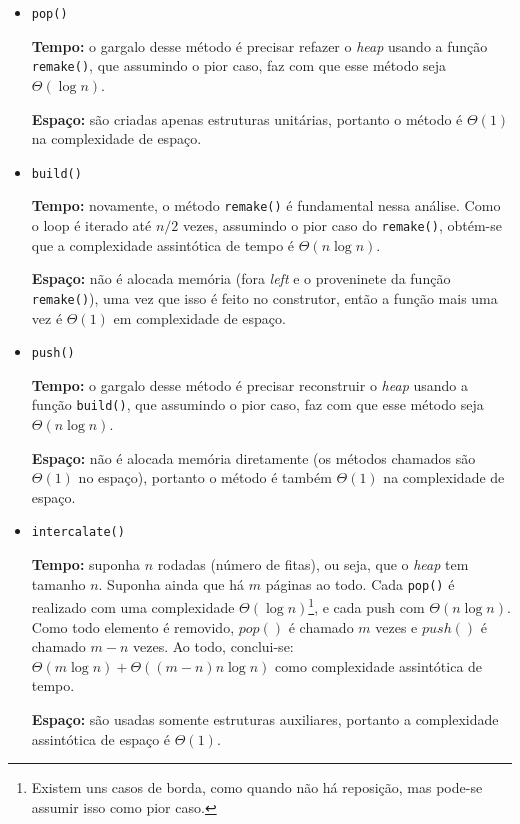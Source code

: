 \documentclass{article}
\def\code#1{\texttt{#1}}
\begin{document}
\begin{itemize}
	\item \code{pop()}

	      \textbf{Tempo:} o gargalo desse método é precisar refazer o \textit{heap} usando a função \code{remake()}, que assumindo o pior caso, faz com que esse método seja \( \Theta(\log n) \).

	      \textbf{Espaço:} são criadas apenas estruturas unitárias, portanto o método é \( \Theta(1) \) na complexidade de espaço.

	\item \code{build()}

	      \textbf{Tempo:} novamente, o método \code{remake()} é fundamental nessa análise. Como o loop é iterado até \( n/2 \) vezes, assumindo o pior caso do \code{remake()}, obtém-se que a complexidade assintótica de tempo é \( \Theta(n \log n) \).

	      \textbf{Espaço:} não é alocada memória (fora \textit{left} e o proveninete da função \code{remake()}), uma vez que isso é feito no construtor, então a função mais uma vez é \( \Theta(1) \) em complexidade de espaço.

	\item \code{push()}

	      \textbf{Tempo:} o gargalo desse método é precisar reconstruir o \textit{heap} usando a função \code{build()}, que assumindo o pior caso, faz com que esse método seja \( \Theta(n \log n) \).

	      \textbf{Espaço:} não é alocada memória diretamente (os métodos chamados são \( \Theta(1) \) no espaço), portanto o método é também \( \Theta(1) \) na complexidade de espaço.

	\item \code{intercalate()}

	      \textbf{Tempo:} suponha \( n \) rodadas (número de fitas), ou seja, que o \textit{heap} tem tamanho \( n \). Suponha ainda que há \( m \) páginas ao todo. Cada \code{pop()} é realizado com uma complexidade \( \Theta(\log n) \)\footnote{Existem uns casos de borda, como quando não há reposição, mas pode-se assumir isso como pior caso.}, e cada push com \( \Theta(n \log n) \). Como todo elemento é removido, \( pop() \) é chamado \( m \) vezes e \( push() \) é chamado \( m - n \) vezes. Ao todo, conclui-se: \( \Theta(m \log n) + \Theta((m-n)n \log n) \) como complexidade assintótica de tempo.

	      \textbf{Espaço:} são usadas somente estruturas auxiliares, portanto a complexidade assintótica de espaço é \( \Theta(1) \).

\end{itemize}
\end{document}
